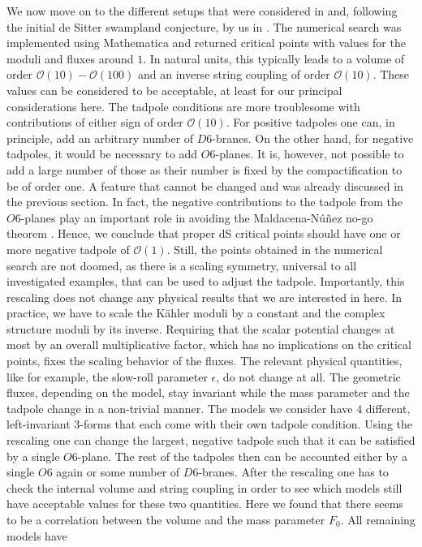 \documentclass[a4paper,12pt,twoside,openright]{report}
\begin{document}
We now move on to the different setups that were considered in \cite{Danielsson:2012et} and, following the initial de Sitter swampland conjecture, by us in \cite{Roupec:2018mbn}. The numerical search was implemented using Mathematica and returned critical points with values for the moduli and fluxes around $1$. In natural units, this typically leads to a volume of order $\mathcal{O}(10)-\mathcal{O}(100)$ and an inverse string coupling of order $\mathcal{O}(10)$. These values can be considered to be acceptable, at least for our principal considerations here. The tadpole conditions are more troublesome with contributions of either sign of order $\mathcal{O}(10)$. For positive tadpoles one can, in principle, add an arbitrary number of $D6$-branes. On the other hand, for negative tadpoles, it would be necessary to add $O6$-planes. It is, however, not possible to add a large number of those as their number is fixed by the compactification to be of order one. A feature that cannot be changed and was already discussed in the previous section. In fact, the negative contributions to the tadpole from the $O6$-planes play an important role in avoiding the Maldacena-N\'{u}\~{n}ez no-go theorem \cite{Maldacena:2000mw}. Hence, we conclude that proper dS critical points should have one or more negative tadpole of $\mathcal{O}(1)$. Still, the points obtained in the numerical search are not doomed, as there is a scaling symmetry, universal to all investigated examples, that can be used to adjust the tadpole. Importantly, this rescaling does not change any physical results that we are interested in here. In practice, we have to scale the Kähler moduli by a constant and the complex structure moduli by its inverse. Requiring that the scalar potential changes at most by an overall multiplicative factor, which has no implications on the critical points, fixes the scaling behavior of the fluxes. The relevant physical quantities, like for example, the slow-roll parameter $\epsilon$, do not change at all. The geometric fluxes, depending on the model, stay invariant while the mass parameter and the tadpole change in a non-trivial manner. The models we consider have $4$ different, left-invariant $3$-forms that each come with their own tadpole condition. Using the rescaling one can change the largest, negative tadpole such that it can be satisfied by a single $O6$-plane. The rest of the tadpoles then can be accounted either by a single $O6$ again or some number of $D6$-branes. After the rescaling one has to check the internal volume and string coupling in order to see which models still have acceptable values for these two quantities. Here we found that there seems to be a correlation between the volume and the mass parameter $F_0$. All remaining models have
\end{document}
